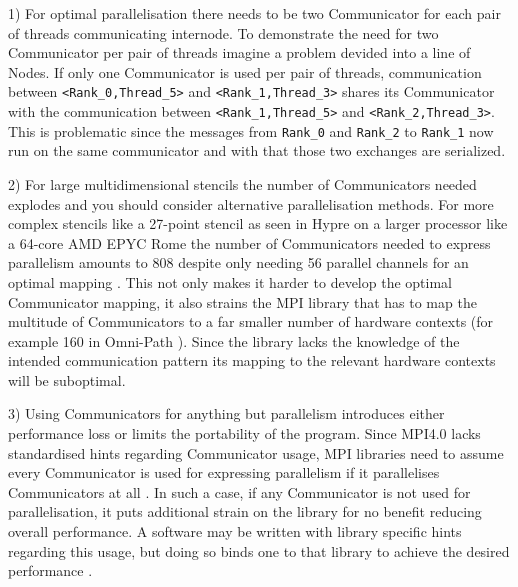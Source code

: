 \documentclass[sigconf]{acmart}
\begin{document}
1) For optimal parallelisation there needs to be two Communicator for each pair of threads communicating internode.
To demonstrate the need for two Communicator per pair of threads imagine a problem devided into a line of Nodes.
If only one Communicator is used per pair of threads, communication between \verb|<Rank_0,Thread_5>| and \verb|<Rank_1,Thread_3>| shares its Communicator with the communication between \verb|<Rank_1,Thread_5>| and \verb|<Rank_2,Thread_3>|.
This is problematic since the messages from \verb|Rank_0| and \verb|Rank_2| to \verb|Rank_1| now run on the same communicator and with that those two exchanges are serialized.

2) For large multidimensional stencils the number of Communicators needed explodes and you should consider alternative parallelisation methods.
For more complex stencils like a 27-point stencil as seen in Hypre\cite{hypre2020} on a larger processor like a 64-core AMD EPYC Rome the number of Communicators needed to express parallelism amounts to 808 despite only needing 56 parallel channels for an optimal mapping \cite{zambreLessonsLearned2022}.
This not only makes it harder to develop the optimal Communicator mapping, it also strains the MPI library that has to map the multitude of Communicators to a far smaller number of hardware contexts (for example 160 in Omni-Path \cite{intelOmniPath}).
Since the library lacks the knowledge of the intended communication pattern its mapping to the relevant hardware contexts will be suboptimal.

3) Using Communicators for anything but parallelism introduces either performance loss or limits the portability of the program.
Since MPI4.0 lacks standardised hints regarding Communicator usage, MPI libraries need to assume every Communicator is used for expressing parallelism if it parallelises Communicators at all .
In such a case, if any Communicator is not used for parallelisation, it puts additional strain on the library for no benefit reducing overall performance.
A software may be written with library specific hints regarding this usage, but doing so binds one to that library to achieve the desired performance \cite{zambreLessonsLearned2022}.
\end{document}
